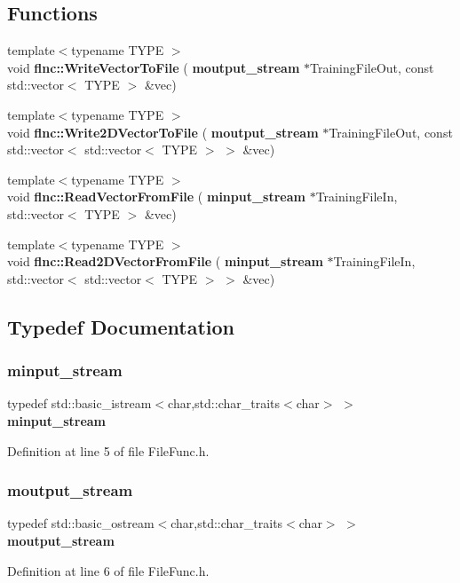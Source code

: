 \subsection*{Functions}
\begin{DoxyCompactItemize}
\item 
{\footnotesize template$<$typename T\+Y\+PE $>$ }\\void \textbf{ flnc\+::\+Write\+Vector\+To\+File} (\textbf{ moutput\+\_\+stream} $\ast$Training\+File\+Out, const std\+::vector$<$ T\+Y\+PE $>$ \&vec)
\item 
{\footnotesize template$<$typename T\+Y\+PE $>$ }\\void \textbf{ flnc\+::\+Write2\+D\+Vector\+To\+File} (\textbf{ moutput\+\_\+stream} $\ast$Training\+File\+Out, const std\+::vector$<$ std\+::vector$<$ T\+Y\+PE $>$ $>$ \&vec)
\item 
{\footnotesize template$<$typename T\+Y\+PE $>$ }\\void \textbf{ flnc\+::\+Read\+Vector\+From\+File} (\textbf{ minput\+\_\+stream} $\ast$Training\+File\+In, std\+::vector$<$ T\+Y\+PE $>$ \&vec)
\item 
{\footnotesize template$<$typename T\+Y\+PE $>$ }\\void \textbf{ flnc\+::\+Read2\+D\+Vector\+From\+File} (\textbf{ minput\+\_\+stream} $\ast$Training\+File\+In, std\+::vector$<$ std\+::vector$<$ T\+Y\+PE $>$ $>$ \&vec)
\end{DoxyCompactItemize}


\subsection{Typedef Documentation}
\mbox{\label{_file_func_8h_ac7d0feb122d3a455f1a91ba26b3de612}} 
\subsubsection{minput\+\_\+stream}
{\footnotesize\ttfamily typedef std\+::basic\+\_\+istream$<$char,std\+::char\+\_\+traits$<$char$>$ $>$ \textbf{ minput\+\_\+stream}}



Definition at line 5 of file File\+Func.\+h.

\mbox{\label{_file_func_8h_adf5ef842b05a918896d7eb7755bbee56}} 
\subsubsection{moutput\+\_\+stream}
{\footnotesize\ttfamily typedef std\+::basic\+\_\+ostream$<$char,std\+::char\+\_\+traits$<$char$>$ $>$ \textbf{ moutput\+\_\+stream}}



Definition at line 6 of file File\+Func.\+h.

